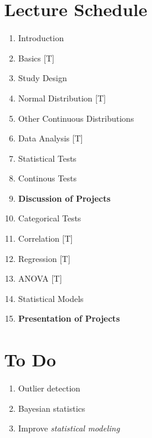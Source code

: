 \clearpage


\clearpage

\section{Lecture Schedule}

\begin{enumerate}
  \item Introduction
  \item Basics [T]
  \item Study Design
  \item Normal Distribution [T]
  \item Other Continuous Distributions
  \item Data Analysis [T]
  \item Statistical Tests
  \item Continous Tests
  \item \textbf{Discussion of Projects}
  \item Categorical Tests
  \item Correlation [T]
  \item Regression [T]
  \item ANOVA [T]
  \item Statistical Models
  \item \textbf{Presentation of Projects}
\end{enumerate}

\section{To Do}

\begin{enumerate}
  \item Outlier detection
  \item Bayesian statistics
  \item Improve \emph{statistical modeling}
\end{enumerate}
